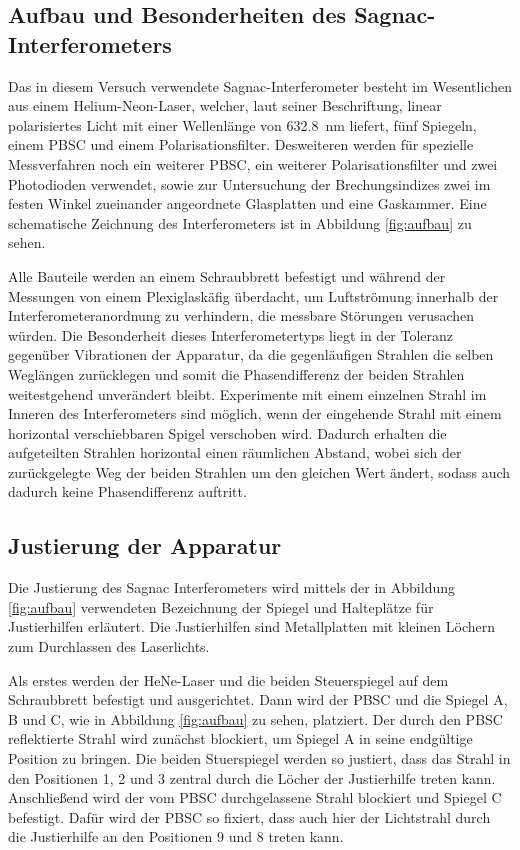 \subsection{Aufbau und Besonderheiten des Sagnac-Interferometers}
Das in diesem Versuch verwendete Sagnac-Interferometer besteht im Wesentlichen aus einem Helium-Neon-Laser, welcher, laut seiner Beschriftung, linear polarisiertes Licht mit einer Wellenlänge von \SI{632.8}{\nano\metre} liefert, fünf Spiegeln, einem PBSC und einem Polarisationsfilter. Desweiteren werden für spezielle Messverfahren noch ein weiterer PBSC, ein weiterer Polarisationsfilter und zwei Photodioden verwendet, sowie zur Untersuchung der Brechungsindizes zwei im festen Winkel zueinander angeordnete Glasplatten und eine Gaskammer. Eine schematische Zeichnung des Interferometers ist in Abbildung \ref{fig:aufbau} zu sehen.

Alle Bauteile werden an einem Schraubbrett befestigt und während der Messungen von einem Plexiglaskäfig überdacht, um Luftströmung innerhalb der Interferometeranordnung zu verhindern, die messbare Störungen verusachen würden. Die Besonderheit dieses Interferometertyps liegt in der Toleranz gegenüber Vibrationen der Apparatur, da die gegenläufigen Strahlen die selben Weglängen zurücklegen und somit die Phasendifferenz der beiden Strahlen weitestgehend unverändert bleibt. Experimente mit einem einzelnen Strahl im Inneren des Interferometers sind möglich, wenn der eingehende Strahl mit einem horizontal verschiebbaren Spigel verschoben wird. Dadurch erhalten die aufgeteilten Strahlen horizontal einen räumlichen Abstand, wobei sich der zurückgelegte Weg der beiden Strahlen um den gleichen Wert ändert, sodass auch dadurch keine Phasendifferenz auftritt.

\subsection{Justierung der Apparatur}
Die Justierung des Sagnac Interferometers wird mittels der in Abbildung \ref{fig:aufbau} verwendeten Bezeichnung der Spiegel und Halteplätze für Justierhilfen erläutert. Die Justierhilfen
sind Metallplatten mit kleinen Löchern zum Durchlassen des Laserlichts.

Als erstes werden der HeNe-Laser und die beiden Steuerspiegel auf dem Schraubbrett befestigt und ausgerichtet. Dann wird der PBSC und die Spiegel A, B und C, wie in Abbildung \ref{fig:aufbau} zu sehen, platziert. Der durch den PBSC reflektierte Strahl wird zunächst blockiert, um Spiegel A in seine endgültige Position zu bringen. Die beiden Stuerspiegel werden so justiert, dass das Strahl in den Positionen 1, 2 und 3 zentral durch die Löcher der Justierhilfe treten kann. Anschließend wird der vom PBSC durchgelassene Strahl blockiert und Spiegel C befestigt. Dafür wird der PBSC so fixiert, dass auch hier der Lichtstrahl durch die Justierhilfe an den Positionen 9 und 8 treten kann.

